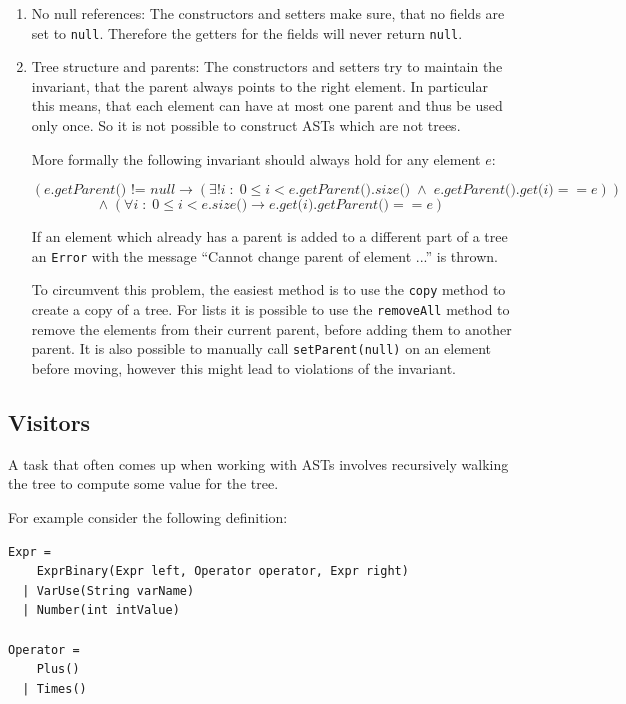 \documentclass{scrartcl}
\begin{document}
\begin{enumerate}
 \item No null references:
  The constructors and setters make sure, that no fields are set to \lstinline!null!.
  Therefore the getters for the fields will never return \lstinline!null!.

 \item Tree structure and parents:
  The constructors and setters try to maintain the invariant, that the parent always points to the right element.
  In particular this means, that each element can have at most one parent and thus be used only once.
  So it is not possible to construct ASTs which are not trees.

  More formally the following invariant should always hold for any element $e$:

  \[ (\textit{e.getParent() != null} \longrightarrow (\exists!i \;:\;  0 \leq i < \textit{e.getParent().size()} \;\wedge\; \textit{e.getParent().get(i)} == e )) \]
  \[ \wedge \; (\forall i  \;:\; 0 \leq i < \textit{e.size()} \longrightarrow   \textit{e.get(i).getParent()} == e) \]

  If an element which already has a parent is added to a different part of a tree an \lstinline!Error! with the message ``Cannot change parent of element ...'' is thrown.

  To circumvent this problem, the easiest method is to use the \lstinline!copy! method to create a copy of a tree.
  For lists it is possible to use the \lstinline!removeAll! method to remove the elements from their current parent, before adding them to another parent.
  It is also possible to manually call \lstinline!setParent(null)! on an element before moving, however this might lead to violations of the invariant.





\end{enumerate}

\subsection{Visitors}
\label{Visitors}

A task that often comes up when working with ASTs involves recursively walking the tree to compute some value for the tree.

For example consider the following definition:

\begin{lstlisting}
Expr =
    ExprBinary(Expr left, Operator operator, Expr right)
  | VarUse(String varName)
  | Number(int intValue)

Operator =
    Plus()
  | Times()
\end{lstlisting}
\end{document}
